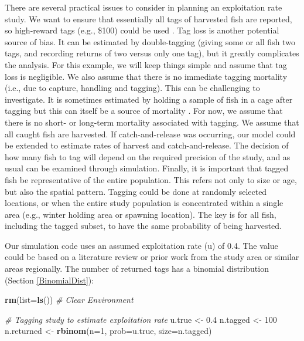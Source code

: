 \documentclass[
]{krantz}
\makeatletter
\newenvironment{Shaded}{\begin{snugshade}}{\end{snugshade}}
\newcommand{\AttributeTok}[1]{\textcolor[rgb]{0.27,0.27,0.27}{#1}}
\newcommand{\CommentTok}[1]{\textcolor[rgb]{0.37,0.37,0.37}{\textit{#1}}}
\newcommand{\DecValTok}[1]{\textcolor[rgb]{0.06,0.06,0.06}{#1}}
\newcommand{\FloatTok}[1]{\textcolor[rgb]{0.06,0.06,0.06}{#1}}
\newcommand{\FunctionTok}[1]{\textcolor[rgb]{0.27,0.27,0.27}{\textbf{#1}}}
\newcommand{\NormalTok}[1]{#1}
\newcommand{\OtherTok}[1]{\textcolor[rgb]{0.37,0.37,0.37}{#1}}
\newenvironment{kframe}{%
\medskip{}
\setlength{\fboxsep}{.8em}
 \def\at@end@of@kframe{}%
 \ifinner\ifhmode%
  \def\at@end@of@kframe{\end{minipage}}%
  \begin{minipage}{\columnwidth}%
 \fi\fi%
 \def\FrameCommand##1{\hskip\@totalleftmargin \hskip-\fboxsep
 \colorbox{shadecolor}{##1}\hskip-\fboxsep
     \hskip-\linewidth \hskip-\@totalleftmargin \hskip\columnwidth}%
 \MakeFramed {\advance\hsize-\width
   \@totalleftmargin\z@ \linewidth\hsize
   \@setminipage}}%
 {\par\unskip\endMakeFramed%
 \at@end@of@kframe}
\renewenvironment{Shaded}{\begin{kframe}}{\end{kframe}}
\makeatother
\begin{document}
There are several practical issues to consider in planning an exploitation rate study. We want to ensure that essentially all tags of harvested fish are reported, so high-reward tags (e.g., \$100) could be used \citep{pollock.etal_2001}. Tag loss is another potential source of bias. It can be estimated by double-tagging (giving some or all fish two tags, and recording returns of two versus only one tag), but it greatly complicates the analysis. For this example, we will keep things simple and assume that tag loss is negligible. We also assume that there is no immediate tagging mortality (i.e., due to capture, handling and tagging). This can be challenging to investigate. It is sometimes estimated by holding a sample of fish in a cage after tagging but this can itself be a source of mortality \citep{pollock.pine2007}. For now, we assume that there is no short- or long-term mortality associated with tagging. We assume that all caught fish are harvested. If catch-and-release was occurring, our model could be extended to estimate rates of harvest and catch-and-release. The decision of how many fish to tag will depend on the required precision of the study, and as usual can be examined through simulation. Finally, it is important that tagged fish be representative of the entire population. This refers not only to size or age, but also the spatial pattern. Tagging could be done at randomly selected locations, or when the entire study population is concentrated within a single area (e.g., winter holding area or spawning location). The key is for all fish, including the tagged subset, to have the same probability of being harvested.

Our simulation code uses an assumed exploitation rate (u) of 0.4. The value could be based on a literature review or prior work from the study area or similar areas regionally. The number of returned tags has a binomial distribution (Section \ref{BinomialDist}):

\begin{Shaded}
\begin{Highlighting}[]
\FunctionTok{rm}\NormalTok{(}\AttributeTok{list=}\FunctionTok{ls}\NormalTok{()) }\CommentTok{\# Clear Environment}

\CommentTok{\# Tagging study to estimate exploitation rate}
\NormalTok{u.true }\OtherTok{\textless{}{-}} \FloatTok{0.4}
\NormalTok{n.tagged }\OtherTok{\textless{}{-}} \DecValTok{100}
\NormalTok{n.returned }\OtherTok{\textless{}{-}} \FunctionTok{rbinom}\NormalTok{(}\AttributeTok{n=}\DecValTok{1}\NormalTok{, }\AttributeTok{prob=}\NormalTok{u.true, }\AttributeTok{size=}\NormalTok{n.tagged)}
\end{Highlighting}
\end{Shaded}
\end{document}
